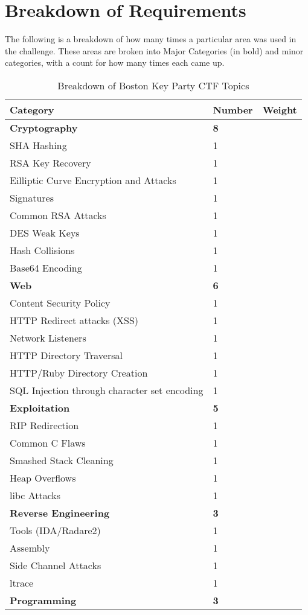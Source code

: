 \documentclass[a4paper,11pt]{report}
\begin{document}
	\section{Breakdown of Requirements}
	 	The following is a breakdown of how many times a particular area was used in the challenge. 
		These areas are broken into Major Categories (in bold) and minor categories, with a count for how many times each came up. 
		\begin{table}[htb]
			\centering
			\begin{tabular}{| l | l | l |}
				\hline
				\textbf{Category} & \textbf{Number} & \textbf{Weight} \\ \hline 
				\textbf{Cryptography} & \textbf{8} & \\ \hline
				\quad SHA Hashing & 1 & \\ \hline 
				\quad RSA Key Recovery & 1 & \\ \hline
				\quad Eilliptic Curve Encryption and Attacks & 1 & \\ \hline
				\quad Signatures & 1 & \\ \hline 
				\quad Common RSA Attacks & 1 & \\ \hline
				\quad DES Weak Keys & 1 & \\ \hline 
				\quad Hash Collisions & 1 & \\ \hline 
				\quad Base64 Encoding & 1 & \\ \hline 
				\textbf{Web} & \textbf{6} & \\ \hline 
				\quad Content Security Policy & 1 & \\ \hline 
				\quad HTTP Redirect attacks (XSS) & 1 & \\ \hline 
				\quad Network Listeners & 1 & \\ \hline 
				\quad HTTP Directory Traversal & 1 & \\ \hline 
				\quad HTTP/Ruby Directory Creation & 1 & \\ \hline 
				\quad SQL Injection through character set encoding & 1 & \\ \hline 
				\textbf{Exploitation} & \textbf{5} & \\ \hline 
				\quad RIP Redirection & 1 & \\ \hline 
				\quad Common C Flaws & 1 & \\ \hline 
				\quad Smashed Stack Cleaning & 1 & \\ \hline 
				\quad Heap Overflows & 1 & \\ \hline 
				\quad libc Attacks & 1 & \\ \hline 
				\textbf{Reverse Engineering} & \textbf{3} & \\ \hline
				\quad Tools (IDA/Radare2) & 1 & \\ \hline 
				\quad Assembly & 1 & \\ \hline 
				\quad Side Channel Attacks & 1 & \\ \hline 
				\quad ltrace & 1 & \\ \hline 
				\textbf{Programming} & \textbf{3} & \\ \hline
			\end{tabular}
			\caption{Breakdown of Boston Key Party CTF Topics}
			\label{tab:BCTFBreakdown}
		\end{table}
\end{document}
